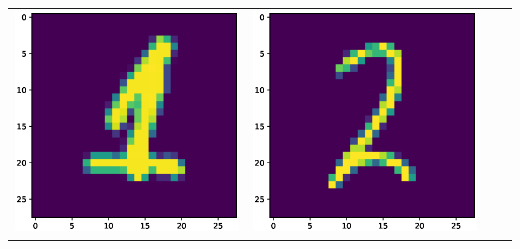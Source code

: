 \documentclass{article}
\begin{document}
\begin{tabular}{cccc}
\includegraphics[scale=.1]{fig/MNIST_962_1_2_733_1.eps}&
\includegraphics[scale=.1]{fig/MNIST_962_1_3_456_2.eps} 



\end{tabular}
\end{document}
